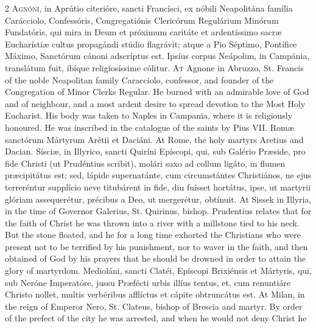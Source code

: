 \begin{paracol}{2}
\lettrine[lines=2]{A}{gnóni,} in Aprútio 
 citerióre, sancti Francísci, ex nóbili Neapolitána família Carácciolo, 
 Confessóris, Congregatiónis Clericórum Regulárium Minórum Fundatóris, qui 
 mira in Deum et próximum caritáte et ardentíssimo sacræ Eucharístiæ cultus 
 propagándi stúdio flagrávit; atque a Pio Séptimo, Pontífice Máximo, 
 Sanctórum cánoni adscríptus est. Ipsíus corpus Neápolim, in Campánia, 
 translátum fuit, ibíque religiosíssime cólitur.
\switchcolumn
{}
\lettrine[lines=2]{A}{t} Agnone in Abruzzo, St. Francis of 
 the noble Neapolitan family Caracciolo, confessor, and founder of the 
 Congregation of Minor Clerks Regular. He burned with an admirable love 
 of God and of neighbour, and a most ardent desire to spread devotion to the 
 Most Holy Eucharist. His body was taken to Naples in Campania, where 
 it is religiously honoured. He was inscribed in the catalogue of the 
 saints by Pius VII.
\switchcolumn*
{}
Romæ sanctórum Mártyrum 
 Arétii et Daciáni.
\switchcolumn
{}
At Rome, the holy martyrs Aretius 
 and Dacian.
\switchcolumn*
{}
Sísciæ, in Illyrico, 
 sancti Quiríni Epíscopi, qui, sub Galério Præside, pro fide Christi (ut 
 Prudéntius scribit), molári saxo ad collum ligáto, in flumen præcipitátus 
 est; sed, lápide supernatánte, cum circumstántes Christiános, ne ejus 
 terreréntur supplício neve titubárent in fide, diu fuísset hortátus, ipse, 
 ut martyrii glóriam assequerétur, précibus a Deo, ut mergerétur, obtínuit.
\switchcolumn
{}
At Sissek in Illyria, in the time of 
 Governor Galerius, St. Quirinus, bishop. Prudentius relates that for 
 the faith of Christ he was thrown into a river with a millstone tied to his 
 neck. But the stone floated, and he for a long time exhorted the 
 Christians who were present not to be terrified by his punishment, nor to 
 waver in the faith, and then obtained of God by his prayers that he should 
 be drowned in order to attain the glory of martyrdom.
\switchcolumn*
{}
Medioláni, sancti 
 Clatéi, Epíscopi Brixiénsis et Mártyris, qui, sub Neróne Imperatóre, jussu 
 Præfécti urbis illíus tentus, et, cum renuntiáre Christo nollet, multis 
 verbéribus afflíctus et cápite obtruncátus est.
\switchcolumn
{}
At Milan, in the reign of Emperor 
 Nero, St. Clateus, bishop of Brescia and martyr. By order of the 
 prefect of the city he was arrested, and when he would not deny Christ he 

\end{paracol}
